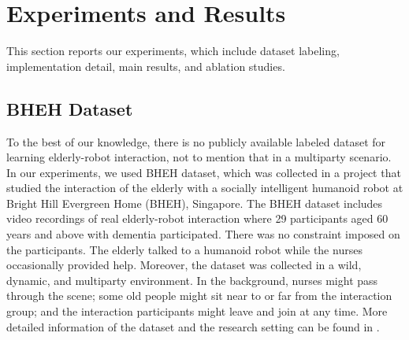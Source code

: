 \documentclass[VANCOUVER,STIX1COL]{WileyNJD-v2}
\begin{document}


\section{Experiments and Results}
\label{s:Experiments_and_Results}

This section reports our experiments, which include dataset labeling, implementation detail, main results, and ablation studies.

\subsection{BHEH Dataset}
\label{subs:BHEH_Dataset}

To the best of our knowledge, there is no publicly available labeled dataset for learning elderly-robot interaction, not to mention that in a multiparty scenario. In our experiments, we used BHEH dataset, which was collected in a project that studied the interaction of the elderly with a socially intelligent humanoid robot at Bright Hill Evergreen Home (BHEH), Singapore.
The BHEH dataset includes video recordings of real elderly-robot interaction where 29 participants aged 60 years and above with dementia participated. There was no constraint imposed on the participants. The elderly talked to a humanoid robot while the nurses occasionally provided help. Moreover, the dataset was collected in a wild, dynamic, and multiparty environment. In the background, nurses might pass through the scene; some old people might sit near to or far from the interaction group; and the interaction participants might leave and join at any time.
More detailed information of the dataset and the research setting can be found in \cite{Mishra2021Does,Tulsulkar2021Can}.
\end{document}

